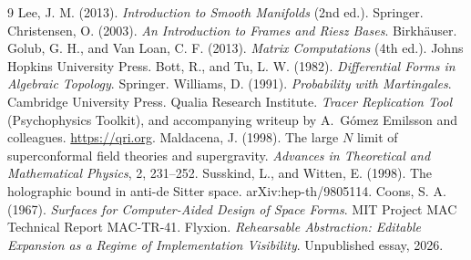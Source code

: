 \documentclass[11pt]{article}
\theoremstyle{remark}
\begin{document}
\newpage
\begin{thebibliography}{9}
 Lee, J. M. (2013). \emph{Introduction to Smooth Manifolds} (2nd ed.). Springer.
 Christensen, O. (2003). \emph{An Introduction to Frames and Riesz Bases}. Birkh\"auser.
 Golub, G. H., and Van Loan, C. F. (2013). \emph{Matrix Computations} (4th ed.). Johns Hopkins University Press.
 Bott, R., and Tu, L. W. (1982). \emph{Differential Forms in Algebraic Topology}. Springer.
 Williams, D. (1991). \emph{Probability with Martingales}. Cambridge University Press.
 Qualia Research Institute. \emph{Tracer Replication Tool} (Psychophysics Toolkit), and accompanying writeup by A.\ G\'omez Emilsson and colleagues. \url{https://qri.org}.
 Maldacena, J. (1998). The large $N$ limit of superconformal field theories and supergravity. \emph{Advances in Theoretical and Mathematical Physics}, 2, 231--252.
 Susskind, L., and Witten, E. (1998). The holographic bound in anti-de Sitter space. arXiv:hep-th/9805114.
 Coons, S. A. (1967). \emph{Surfaces for Computer-Aided Design of Space Forms}. MIT Project MAC Technical Report MAC-TR-41.
 Flyxion. \emph{Rehearsable Abstraction: Editable Expansion as a Regime of Implementation Visibility}. Unpublished essay, 2026.
\end{thebibliography}
\end{document}
